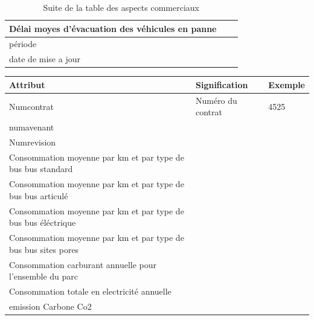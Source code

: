 \documentclass[a4paper]{report}
\begin{document}
\begin{doublespace}
\begin{table}[H]
\begin{center}
\begin{tabularx}{17.5cm}{|X|p{3cm}|p{1.5cm}|}
				\hline
				Délai moyes d'évacuation des véhicules en panne &                        &                  \\
				\hline
				période                                         &                        &                  \\
				\hline
				date de mise a jour                             &                        &                  \\
				\hline
			\end{tabularx}
			\caption{Suite de la table des aspects commerciaux}
		\end{center}
	\end{table}

	\begin{table}[H]
		\begin{center}
			\begin{tabularx}{17.5cm}{|X|p{3cm}|p{1.5cm}|}
				\hline
				\textbf{Attribut}                                              & \textbf{Signification} & \textbf{Exemple} \\
				\hline
				Numcontrat                                                     & Numéro du contrat      & 4525             \\
				\hline
				numavenant                                                     &                        &                  \\
				\hline
				Numrevision                                                    &                        &                  \\
				\hline
				Consommation moyenne par km et par type de bus bus standard    &                        &                  \\
				\hline
				Consommation moyenne par km et par type de bus bus articulé    &                        &                  \\
				\hline
				Consommation moyenne par km et par type de bus bus éléctrique  &                        &                  \\
				\hline
				Consommation moyenne par km et par type de bus bus sites pores &                        &                  \\
				\hline
				Consommation carburant annuelle pour l'ensemble du parc        &                        &                  \\
				\hline
				Consommation totale en electricité annuelle                    &                        &                  \\
				\hline
				emission Carbone  Co2                                          &                        &                  \\

\end{tabularx}
\end{center}
\end{table}
\end{doublespace}
\end{document}
